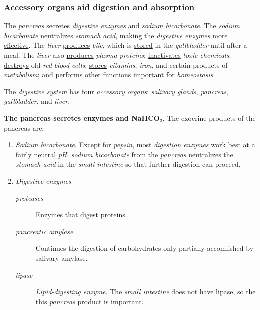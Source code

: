 \documentclass[11pt]{article}
\begin{document}
\subsubsection{Accessory organs aid digestion and absorption}
\label{sec:org3bde650}
The \emph{pancreas} \uline{secretes} \emph{digestive enzymes} and \emph{sodium bicarbonate}. The \emph{sodium
bicarbonate} \uline{neutralizes} \emph{stomach acid}, making the \emph{digestive enzymes} \uline{more
effective}. The \emph{liver} \uline{produces} \emph{bile}, which is \uline{stored} in the \emph{gallbladder} until
after a meal. The \emph{liver} also \uline{produces} \emph{plasma proteins}; \uline{inactivates} \emph{toxic
chemicals}; \uline{destroys} old \emph{red blood cells}; \uline{stores} \emph{vitamins}, \emph{iron}, and certain
products of \emph{metabolism}; and performs \uline{other functions} important for \emph{homeostasis}.

The \emph{digestive system} has four \emph{accessory organs}: \emph{salivary glands}, \emph{pancreas},
\emph{gallbladder}, and \emph{liver}.

\textbf{The pancreas secretes enzymes and NaHCO\(_{\text{3}}\)}. The exocrine products of the
pancreas are:
\begin{enumerate}
\item \emph{Sodium bicarbonate}. Except for \emph{pepsin}, most \emph{digestion enzymes} work \uline{best} at a
fairly \uline{neutral \emph{pH}}. \emph{sodium bicarbonate} from the \emph{pancreas} neutralizes the
\emph{stomach acid} in the \emph{small intestine} so that further digestion can proceed.
\item \emph{Digestive enzymes}
\begin{description}
\item[{\emph{proteases}}] Enzymes that digest proteins.
\item[{\emph{pancreatic amylase}}] Continues the digestion of carbohydrates only
partially accomlished by salivary amylase.
\item[{\emph{lipase}}] \emph{Lipid-digesting enzyme}. The \emph{small intestine} does not have lipase,
so the this \uline{\emph{pancreas} product} is important.
\end{description}
\end{enumerate}
\end{document}
